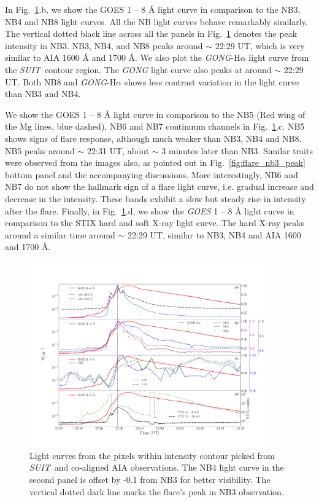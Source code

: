 \documentclass[lineno, pdflatex,sn-mathphys-ay]{sn-jnl}%
\newcommand{\suit}{{\it{SUIT}}}
\begin{document}
In Fig.~\ref{fig:flare_lc_suit}.b, we show the GOES 1 {--} 8 {\AA} light curve in comparison to the NB3, NB4 and NB8 light curves. All the NB light curves behave remarkably similarly. The vertical dotted black line across all the panels in Fig.~\ref{fig:flare_lc_suit} denotes the peak intensity in NB3. NB3, NB4, and NB8 peaks around $\sim$ 22:29 UT, which is very similar to AIA 1600 {\AA} and 1700 {\AA}. We also plot the {\it GONG}-H$\alpha$ light curve from the \suit~contour region. The {\it GONG} light curve also peaks at around $\sim$ 22:29 UT. Both NB8 and {\it GONG}-H$\alpha$ shows less contrast variation in the light curve than NB3 and NB4.

We show the GOES 1 {--} 8 {\AA} light curve in comparison to the NB5 (Red wing of the Mg lines, blue dashed), NB6 and NB7 continuum channels in Fig.~\ref{fig:flare_lc_suit}.c. NB5 shows signs of flare response, although much weaker than NB3, NB4 and NB8. NB5 peaks around $\sim$ 22:31 UT, about $\sim$ 3 minutes later than NB3. Similar traits were observed from the images also, as pointed out in Fig.~\ref{fig:flare_nb3_peak} bottom panel and the accompanying discussions. More interestingly, NB6 and NB7 do not show the hallmark sign of a flare light curve, i.e. gradual increase and decrease in the intensity. These bands exhibit a slow but steady rise in intensity after the flare. Finally, in Fig.~\ref{fig:flare_lc_suit}.d, we show the {\it GOES} 1 {--} 8 {\AA} light curve in comparison to the STIX hard and soft X-ray light curve. The hard X-ray peaks around a similar time around $\sim$ 22:29 UT, similar to NB3, NB4 and AIA 1600 and 1700 {\AA}.

\begin{figure}
    \centering
    \includegraphics[width=0.9\textwidth,trim={2.3cm 2.5cm 0cm 4.5cm},clip]{lc_suit_contour.pdf}
    \caption{Light curves from the pixels within intensity contour picked from \suit~and co-aligned AIA observations. The NB4 light curve in the second panel is offset by -0.1 from NB3 for better visibility. The vertical dotted dark line marks the flare's peak in NB3 observation.}
    \label{fig:flare_lc_suit}
\end{figure}
\end{document}
